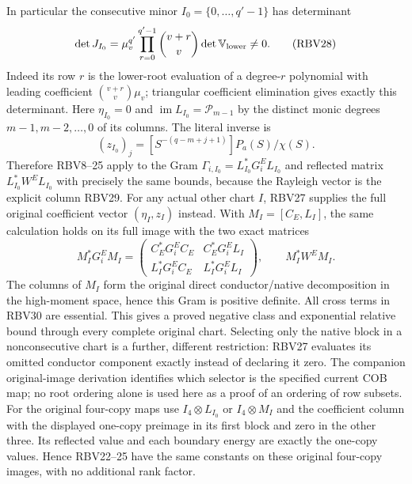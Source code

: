 \documentclass[11pt,a4paper]{article}
\begin{document}
In particular the consecutive minor
$I_0=\{0,\ldots,q'-1\}$ has determinant
\[
\det J_{I_0}=\mu_v^{q'}
 \prod_{r=0}^{q'-1}\binom{v+r}{v}\det\mathbb V_{\rm lower}\ne0.
\tag{RBV28}
\]
Indeed its row $r$ is the lower-root evaluation of a degree-$r$
polynomial with leading coefficient $\binom{v+r}{v}\mu_v$;
triangular coefficient elimination gives exactly this determinant.
Here $\eta_{I_0}=0$ and
$\operatorname{im}L_{I_0}=\mathcal P_{m-1}$ by the distinct monic
degrees $m-1,m-2,\ldots,0$ of its columns. The literal inverse is
\[
(z_{I_0})_j=[S^{-(q-m+j+1)}]P_a(S)/\chi(S).
\tag{RBV29}
\]
Therefore RBV8--25 apply to the Gram
$\Gamma_{i,I_0}=L_{I_0}^*G_i^EL_{I_0}$ and reflected matrix
$L_{I_0}^*W^EL_{I_0}$ with precisely the same bounds, because the
Rayleigh vector is the explicit column RBV29. For any actual other
chart $I$, RBV27 supplies the full original coefficient vector
$(\eta_I,z_I)$ instead. With $M_I=[C_E,L_I]$, the same calculation
holds on its full image with the two exact matrices
\[
M_I^*G_i^EM_I=\begin{pmatrix}
C_E^*G_i^EC_E&C_E^*G_i^EL_I\\
L_I^*G_i^EC_E&L_I^*G_i^EL_I
\end{pmatrix},\qquad M_I^*W^EM_I.
\tag{RBV30}
\]
The columns of $M_I$ form the original direct conductor/native
decomposition in the high-moment space, hence this Gram is positive
definite. All cross terms in RBV30 are essential.
This gives a proved negative class and exponential relative bound
through every complete original chart. Selecting only the native
block in a nonconsecutive chart is a further, different restriction:
RBV27 evaluates its omitted conductor component exactly instead of
declaring it zero. The companion original-image derivation identifies
which selector is the specified current COB map; no root ordering
alone is used here as a proof of an ordering of row subsets.
For the original four-copy maps use $I_4\otimes L_{I_0}$ or
$I_4\otimes M_I$ and the coefficient column with the displayed
one-copy preimage in its first block and zero in the other three.
Its reflected value and each boundary energy are exactly the
one-copy values. Hence RBV22--25 have the same constants on these
original four-copy images, with no additional rank factor.
\end{document}
